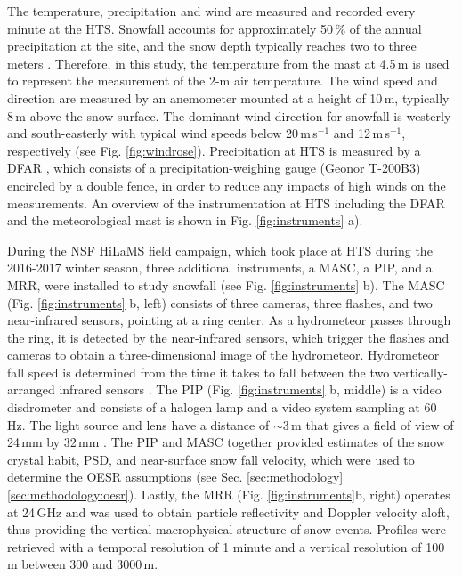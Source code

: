 \documentclass{ametsocV5}
\begin{document}
        The temperature, precipitation and wind are measured and recorded every minute at the HTS. Snowfall accounts for approximately 50\,\% of the annual precipitation at the site, and the snow depth typically reaches two to three meters \citep{wolff_derivation_2015}. Therefore, in this study, the temperature from the mast at 4.5\,m is used to represent the measurement of the 2-m air temperature. The wind speed and direction are measured by an anemometer mounted at a height of 10\,m, typically 8\,m above the snow surface. The dominant wind direction for snowfall is westerly and south-easterly with typical wind speeds below 20\,m\,s$^{-1}$ and 12\,m\,s$^{-1}$, respectively (see Fig. \ref{fig:windrose}). Precipitation at HTS is measured by a DFAR \citep{goodison_wmo_1998}, which consists of a precipitation-weighing gauge (Geonor T-200B3) encircled by a double fence, in order to reduce any impacts of high winds on the measurements. An overview of the instrumentation at HTS including the DFAR and the meteorological mast is shown in Fig. \ref{fig:instruments} a). 
    
        During the NSF HiLaMS field campaign, which took place at HTS during the 2016-2017 winter season, three additional instruments, a MASC, a PIP, and a MRR, were installed to study snowfall (see Fig. \ref{fig:instruments} b). The MASC (Fig. \ref{fig:instruments} b, left) consists of three cameras, three flashes, and two near-infrared sensors, pointing at a ring center. As a hydrometeor passes through the ring, it is detected by the near-infrared sensors, which trigger the flashes and cameras to obtain a three-dimensional image of the hydrometeor. Hydrometeor fall speed is determined from the time it takes to fall between the two vertically-arranged infrared sensors \citep{garrett_fall_2012}. The PIP (Fig. \ref{fig:instruments} b, middle) is a video disdrometer and consists of a halogen lamp and a video system sampling at 60\,Hz. The light source and lens have a distance of $\sim$3\,m that gives a field of view of 24\,mm by 32\,mm \citep{newman_presenting_2009}. The PIP and MASC together provided estimates of the snow crystal habit, PSD, and near-surface snow fall velocity, which were used to determine the OESR assumptions (see Sec. \ref{sec:methodology}\ref{sec:methodology:oesr}). Lastly, the MRR (Fig. \ref{fig:instruments}b, right) operates at 24\,GHz and was used to obtain particle reflectivity and Doppler velocity aloft, thus providing the vertical macrophysical structure of snow events. Profiles were retrieved with a temporal resolution of 1 minute and a vertical resolution of 100\,m between 300 and 3000\,m. 
\end{document}
